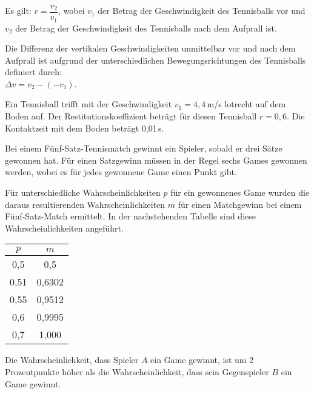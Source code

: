 \begin{langesbeispiel}
\begin{aufgabenstellung}
	Es gilt: $r=\dfrac{v_2}{v_1}$, wobei $v_1$ der Betrag der Geschwindigkeit des Tennisballs vor und $v_2$ der Betrag der Geschwindigkeit des Tennisballs nach dem Aufprall ist.
	
	Die Differenz der vertikalen Geschwindigkeiten unmittelbar vor und nach dem Aufprall ist aufgrund der unterschiedlichen Bewegungsrichtungen des Tennisballs definiert durch:\\
	$\Delta v=v_2-(-v_1)$.%

	
Ein Tennisball trifft mit der Geschwindigkeit $v_1=4,4$\,m/s lotrecht auf dem Boden auf. Der Restitutionskoeffizient beträgt für diesen Tennisball $r=0,6$. Die Kontaktzeit mit dem Boden beträgt 0,01\,s.	
	

\item Bei einem Fünf-Satz-Tennismatch gewinnt ein Spieler, sobald er drei Sätze gewonnen hat. Für einen Satzgewinn müssen in der Regel sechs Games gewonnen werden, wobei es für jedes gewonnene Game einen Punkt gibt.
	
	Für unterschiedliche Wahrscheinlichkeiten $p$ für ein gewonnenes Game wurden die daraus resultierenden Wahrscheinlichkeiten $m$ für einen Matchgewinn bei einem Fünf-Satz-Match ermittelt. In der nachstehenden Tabelle sind diese Wahrscheinlichkeiten angeführt.
	
	\begin{center}
	\begin{tabular}{|c|c|}\hline
	\cellcolor[gray]{0.9}$p$&\cellcolor[gray]{0.9}$m$\\ \hline
	0,5&0,5\\ \hline
	0,51&0,6302\\ \hline
	0,55&0,9512\\ \hline
	0,6&0,9995\\ \hline
	0,7&1,000\\ \hline
	\end{tabular}
	\end{center}
	
	Die Wahrscheinlichkeit, dass Spieler $A$ ein Game gewinnt, ist um 2 Prozentpunkte höher als die Wahrscheinlichkeit, dass sein Gegenspieler $B$ ein Game gewinnt.%


\end{aufgabenstellung}
\end{langesbeispiel}
